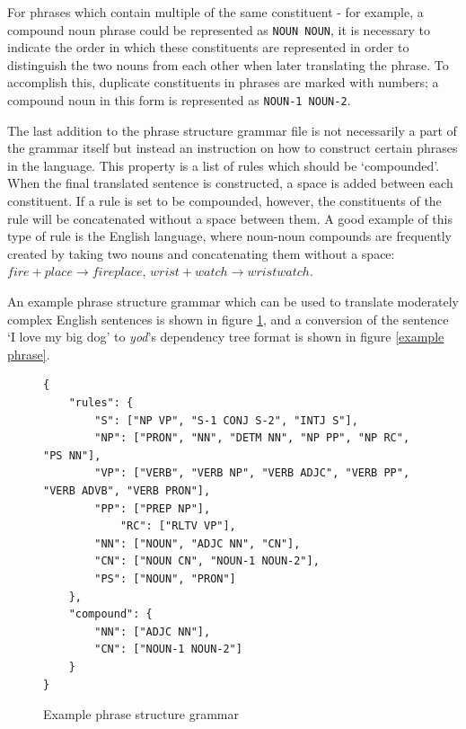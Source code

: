 \documentclass{report}
\begin{document}
	For phrases which contain multiple of the same constituent - for example, a compound noun phrase could be represented as \texttt{NOUN NOUN}, it is necessary to indicate the order in which these constituents are represented in order to distinguish the two nouns from each other when later translating the phrase. To accomplish this, duplicate constituents in phrases are marked with numbers; a compound noun in this form is represented as \texttt{NOUN-1 NOUN-2}.
	
	The last addition to the phrase structure grammar file is not necessarily a part of the grammar itself but instead an instruction on how to construct certain phrases in the language. This property is a list of rules which should be `compounded'. When the final translated sentence is constructed, a space is added between each constituent. If a rule is set to be compounded, however, the constituents of the rule will be concatenated without a space between them. A good example of this type of rule is the English language, where noun-noun compounds are frequently created by taking two nouns and concatenating them without a space: $fire + place \rightarrow fireplace$, $wrist + watch \rightarrow wristwatch$.

	An example phrase structure grammar which can be used to translate moderately complex English sentences is shown in figure \ref{example phrase structure grammar}, and a conversion of the sentence `I love my big dog' to \textit{yod}'s dependency tree format is shown in figure \ref{example phrase}.
	
	\begin{figure}
		\caption{Example phrase structure grammar}
		\label{example phrase structure grammar}
		\begin{tcolorbox}
			\begin{lstlisting}[breaklines=true,tabsize=2]
{
	"rules": {
		"S": ["NP VP", "S-1 CONJ S-2", "INTJ S"],
		"NP": ["PRON", "NN", "DETM NN", "NP PP", "NP RC", "PS NN"],
		"VP": ["VERB", "VERB NP", "VERB ADJC", "VERB PP", "VERB ADVB", "VERB PRON"],
		"PP": ["PREP NP"],
			"RC": ["RLTV VP"],
		"NN": ["NOUN", "ADJC NN", "CN"],
		"CN": ["NOUN CN", "NOUN-1 NOUN-2"],
		"PS": ["NOUN", "PRON"]
	},
	"compound": {
		"NN": ["ADJC NN"],
		"CN": ["NOUN-1 NOUN-2"]
	}
}
			\end{lstlisting}
		\end{tcolorbox}
	\end{figure}
\end{document}
